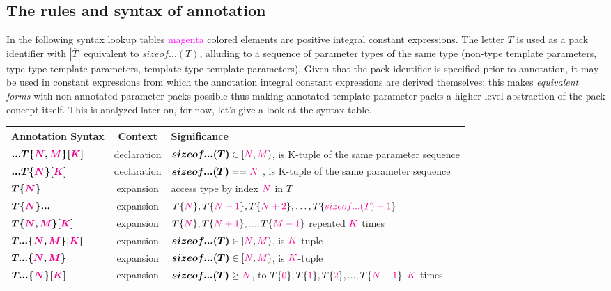 
\subsection{The rules and syntax of annotation}

\p In the following syntax lookup tables \textcolor{Magenta}{magenta} colored elements are positive integral constant expressions.
The letter $T$ is used as a pack identifier with $|\overline{T}|$ equivalent to $sizeof...(T)$, alluding to a sequence of parameter types of the same type (non-type template parameters, type-type template parameters, template-type template parameters).
Given that the pack identifier is specified prior to annotation, it may be used in constant expressions from which the annotation integral constant expressions are derived themselves; this makes \textit{equivalent forms} with non-annotated parameter packs possible thus making annotated template parameter packs a higher level abstraction of the pack concept itself.
This is analyzed later on, for now, let's give a look at the syntax table.

\begin{tabularx}{\textwidth}{l|c|X}
  \textbf{Annotation Syntax} & \textbf{Context}  &\textbf{Significance} \\
\hline
$\bm{...T\{\textcolor{Magenta}{\textcolor{Magenta}{N}},\textcolor{Magenta}{M}\}[\textcolor{Magenta}{K}]}$ & declaration & $\bm{sizeof...(T)} \in [\textcolor{Magenta}{N},\textcolor{Magenta}{M})$, is K-tuple of the same parameter sequence \\
$\bm{...T\{\textcolor{Magenta}{N}\}[\textcolor{Magenta}{K}]}$ & declaration & $\bm{sizeof...(T)} == \textcolor{Magenta}{N}$ , is K-tuple of the same parameter sequence \\
$\bm{T\{\textcolor{Magenta}{N}\}}$ & expansion & access type by index $\textcolor{Magenta}{N}$ in $T$ \\
$\bm{T\{\textcolor{Magenta}{N}\}...}$ & expansion& $T\{\textcolor{Magenta}{N}\},T\{\textcolor{Magenta}{N+1}\},T\{\textcolor{Magenta}{N+2}\},\dots{},T\{\textcolor{Magenta}{sizeof...(T)-1}\}$ \\
$\bm{T\{\textcolor{Magenta}{N},\textcolor{Magenta}{M}\}[\textcolor{Magenta}{K}]}$ & expansion & $T\{\textcolor{Magenta}{N}\},T\{\textcolor{Magenta}{N+1}\},...,T\{\textcolor{Magenta}{M-1}\}$ repeated $\textcolor{Magenta}{K}$ times \\
$\bm{T...\{\textcolor{Magenta}{N},\textcolor{Magenta}{M}\}[\textcolor{Magenta}{K}]}$ & expansion & $\bm{sizeof...(T)} \in [\textcolor{Magenta}{N},\textcolor{Magenta}{M})$, is $\textcolor{Magenta}{K}$-tuple \\
$\bm{T...\{\textcolor{Magenta}{N},\textcolor{Magenta}{M}\}}$ & expansion & $\bm{sizeof...(T)} \in [\textcolor{Magenta}{N},\textcolor{Magenta}{M})$, is $\textcolor{Magenta}{K}$-tuple \\
$\bm{T...\{\textcolor{Magenta}{N}\}[\textcolor{Magenta}{K}]}$ & expansion & $\bm{sizeof...(T)}\geq{\textcolor{Magenta}{N}}$, to $T\{\textcolor{Magenta}{0}\},T\{\textcolor{Magenta}{1}\},T\{\textcolor{Magenta}{2}\},...,T\{\textcolor{Magenta}{N-1}\}$ $\textcolor{Magenta}{K}$ times\\
\end{tabularx}

